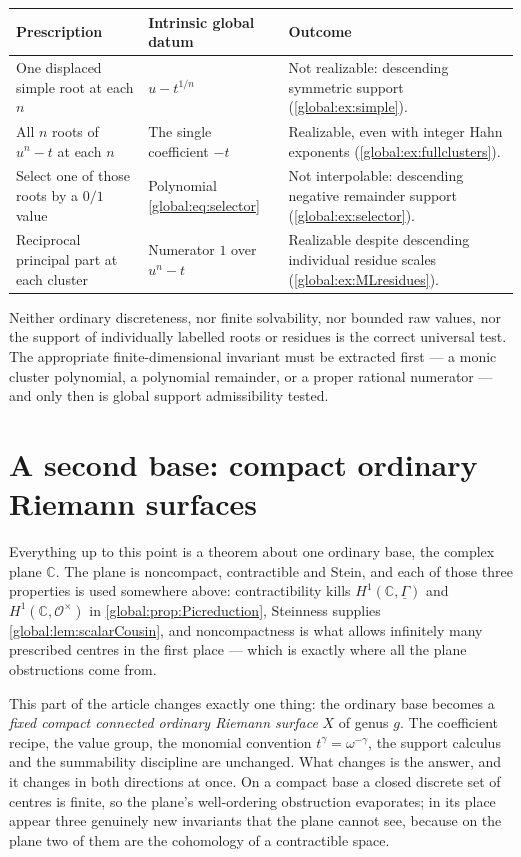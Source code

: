 \documentclass[11pt,letterpaper]{article}
\theoremstyle{definition}
\theoremstyle{remark}
\newcommand{\C}{\mathbb C}
\newcommand{\OO}{\mathcal O}
\numberwithin{equation}{section}
\begin{document}
\begin{center}\small
\begin{tabular}{@{}L{0.30\textwidth}L{0.28\textwidth}L{0.34\textwidth}@{}}
\toprule
Prescription & Intrinsic global datum & Outcome\\
\midrule
One displaced simple root at each $n$ & $u-t^{1/n}$ & Not realizable: descending symmetric support (\cref{global:ex:simple}).\\[0.45em]
All $n$ roots of $u^n-t$ at each $n$ & The single coefficient $-t$ & Realizable, even with integer Hahn exponents (\cref{global:ex:fullclusters}).\\[0.45em]
Select one of those roots by a $0/1$ value & Polynomial \eqref{global:eq:selector} & Not interpolable: descending negative remainder support (\cref{global:ex:selector}).\\[0.45em]
Reciprocal principal part at each cluster & Numerator $1$ over $u^n-t$ & Realizable despite descending individual residue scales (\cref{global:ex:MLresidues}).\\
\bottomrule
\end{tabular}
\end{center}

Neither ordinary discreteness, nor finite solvability, nor bounded raw values, nor the support of individually labelled roots or residues is the correct universal test. The appropriate finite-dimensional invariant must be extracted first --- a monic cluster polynomial, a polynomial remainder, or a proper rational numerator --- and only then is global support admissibility tested.

\section{A second base: compact ordinary Riemann surfaces}\label{global:sec:compactbridge}

Everything up to this point is a theorem about one ordinary base, the complex plane $\C$. The plane is noncompact, contractible and Stein, and each of those three properties is used somewhere above: contractibility kills $H^1(\C,\underline\Gamma)$ and $H^1(\C,\OO^\times)$ in \cref{global:prop:Picreduction}, Steinness supplies \cref{global:lem:scalarCousin}, and noncompactness is what allows infinitely many prescribed centres in the first place --- which is exactly where all the plane obstructions come from.

This part of the article changes exactly one thing: the ordinary base becomes a \emph{fixed compact connected ordinary Riemann surface} $X$ of genus $g$. The coefficient recipe, the value group, the monomial convention $t^\gamma=\omega^{-\gamma}$, the support calculus and the summability discipline are unchanged. What changes is the answer, and it changes in both directions at once. On a compact base a closed discrete set of centres is finite, so the plane's well-ordering obstruction evaporates; in its place appear three genuinely new invariants that the plane cannot see, because on the plane two of them are the cohomology of a contractible space.
\end{document}
